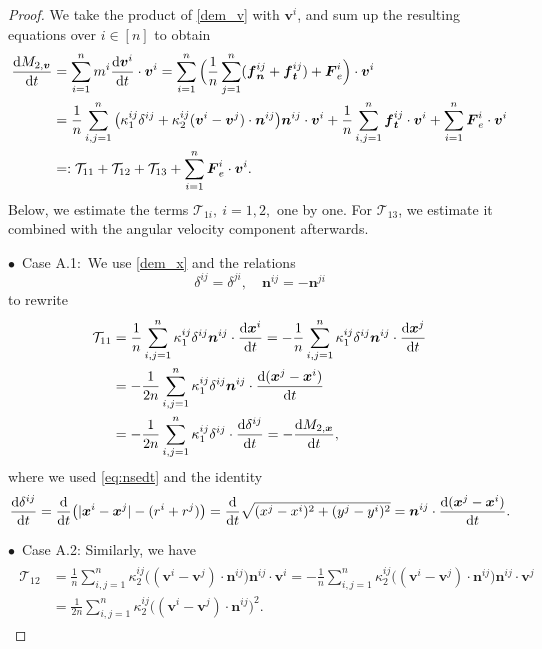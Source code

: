 \documentclass[a4paper,11pt]{article}
\numberwithin{equation}{section}
\theoremstyle{definition}
\newcommand{\bfx}{\boldsymbol{x}}
\newcommand{\bfv}{\boldsymbol{v}}
\newcommand{\bfn}{\boldsymbol{n}}
\newcommand{\bft}{\boldsymbol{t}}
\newcommand{\bff}{\boldsymbol{f}}
\newcommand{\bfF}{\boldsymbol{F}}
\def\d{{  \rm d}}
\newcommand{\T}{\mathcal{T}}
\begin{document}
\begin{proof}
We take the product of \eqref{dem_v} with $\bfv^i$, and sum up the resulting equations over $i \in [n]$ to obtain
\begin{align}
    \frac{\d M_{2,\bfv}}{\d t} & = \sum_{i=1}^n m^i\frac{\d\bfv^i}{\d t} \cdot \bfv^i =  \sum_{i=1}^n \Big( \frac{1}{n}\sum_{j=1}^{n} (\bff_{\bfn}^{ij} + \bff_{\bft}^{ij})  + \bfF^i_e \Big) \cdot \bfv^i \nonumber  \\
    & = \frac{1}{n}  \sum_{i, j=1}^n    \big( \kappa^{ij}_1 \delta^{ij} + \kappa_2^{ij} (\bfv^i  - \bfv^j )\cdot\bfn^{ij} \big) \bfn^{ij} \cdot \bfv^i  +  \frac{1}{n}  \sum_{i, j=1}^n \bff_{\bft}^{ij} \cdot \bfv^i + \sum_{i=1}^{n} \bfF^i_e \cdot \bfv^i  \nonumber \\
    & =:  \T_{11} + \T_{12} +\T_{13} +   \sum_{i=1}^{n}\bfF^i_e \cdot \bfv^i.  \label{eq:dtM2v}
\end{align}
%
Below, we estimate the terms $\T_{1i},~i=1,2,$ one by one. For $\T_{13}$, we estimate it combined with the angular velocity component afterwards. 

\noindent $\bullet$~Case A.1:~We use \eqref{dem_x} and the relations
\[ \delta^{ij} = \delta^{ji}, \quad  \bfn^{ij} = -\bfn^{ji}  \]
to rewrite 
\begin{align}
\begin{aligned} \label{eq:T11}
    \T_{11} & =  \frac{1}{n} \sum_{i, j=1}^n \kappa^{ij}_1 \delta^{ij}\bfn^{ij} \cdot \frac{\d\bfx^i}{\d t}  =  -\frac{1}{n} \sum_{i, j=1}^n \kappa^{ij}_1 \delta^{ij}\bfn^{ij} \cdot \frac{\d\bfx^j}{\d t}\\
    & = - \frac{1}{2n} \sum_{i, j=1}^n \kappa^{ij}_1 \delta^{ij}  \bfn^{ij} \cdot \frac{\d (\bfx^j - \bfx^i)}{\d t}  \\
    & =  - \frac{1}{2n} \sum_{i, j=1}^n \kappa^{ij}_1 \delta^{ij} \cdot \frac{\d \delta^{ij}}{\d t} = - \frac{\d M_{2,\bfx}}{\d t},   
\end{aligned}
\end{align}
where we used \eqref{eq:nsedt} and the identity
\begin{align*}
\begin{aligned}
    \frac{\d \delta^{ij}}{\d t} = \frac{\d}{\d t} \big(|\bfx^i-\bfx^j|- (r^i+r^j)\big)  = \frac{\d}{\d t}  \sqrt{(x^j - x^i)^2 + (y^j - y^i)^2} = \bfn^{ij} \cdot \frac{\d (\bfx^j - \bfx^i)}{\d t}.   
\end{aligned}
\end{align*}


\noindent $\bullet$~Case A.2:  Similarly, we have
\begin{align}
\begin{aligned} \label{eq:T12}
    \T_{12} &  =  \frac{1}{n} \sum_{i, j=1}^n \kappa^{ij}_2  \big( (\bfv^i - \bfv^j )\cdot\bfn^{ij}\big) \bfn^{ij}   \cdot \bfv^i = - \frac{1}{n} \sum_{i, j=1}^n \kappa^{ij}_2  \big( (\bfv^i - \bfv^j )\cdot\bfn^{ij}\big) \bfn^{ij}   \cdot \bfv^j   \\
    &  =  \frac{1}{2n} \sum_{i, j=1}^n \kappa^{ij}_2   \big( (\bfv^i - \bfv^j )\cdot\bfn^{ij} \big)^2. 
\end{aligned}   
\end{align}


\end{proof}
\end{document}
